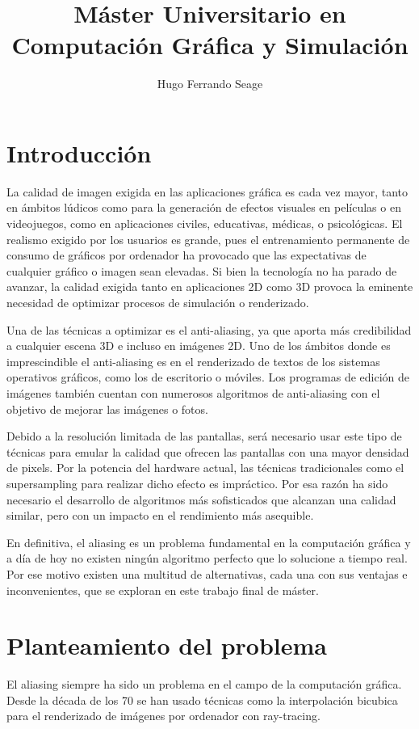 \documentclass[withindex, glossary]{cam-thesis}
\title{Máster Universitario en Computación Gráfica y Simulación\protect\\\bigskip \normalfont{2018\protect\\\bigskip Trabajo Final de Máster\protect\\\bigskip Estudio sobre sistemas de anti-aliasing e implementación de anti-aliasing temporal}}
\author{Hugo Ferrando Seage}
\begin{document}
\frontmatter{}

\chapter{Introducción}

La calidad de imagen exigida en las aplicaciones gráfica es cada vez mayor, tanto en ámbitos lúdicos como para la generación de efectos visuales en películas o en videojuegos, como en aplicaciones civiles, educativas, médicas\cite{rayos}, o psicológicas. El realismo exigido por los usuarios es grande, pues el entrenamiento permanente de consumo de gráficos por ordenador ha provocado que las expectativas de cualquier gráfico o imagen sean elevadas. Si bien la tecnología no ha parado de avanzar, la calidad exigida tanto en aplicaciones 2D como 3D provoca la eminente necesidad de optimizar procesos de simulación o renderizado.

Una de las técnicas a optimizar es el anti-aliasing, ya que aporta más credibilidad a cualquier escena 3D e incluso en imágenes 2D. Uno de los ámbitos donde es imprescindible el anti-aliasing es en el renderizado de textos de los sistemas operativos gráficos, como los de escritorio o móviles. Los programas de edición de imágenes también cuentan con numerosos algoritmos de anti-aliasing con el objetivo de mejorar las imágenes o fotos.

Debido a la resolución limitada de las pantallas, será necesario usar este tipo de técnicas para emular la calidad que ofrecen las pantallas con una mayor densidad de pixels. Por la potencia del hardware actual, las técnicas tradicionales como el supersampling para realizar dicho efecto es impráctico. Por esa razón ha sido necesario el desarrollo de algoritmos más sofisticados que alcanzan una calidad similar, pero con un impacto en el rendimiento más asequible.

En definitiva, el aliasing es un problema fundamental en la computación gráfica y a día de hoy no existen ningún algoritmo perfecto que lo solucione a tiempo real. Por ese motivo existen una multitud de alternativas, cada una con sus ventajas e inconvenientes, que se exploran en este trabajo final de máster.

\chapter{Planteamiento del problema}

El aliasing siempre ha sido un problema en el campo de la computación gráfica. Desde la década de los 70 se han usado técnicas como la interpolación bicubica para el renderizado de imágenes por ordenador con ray-tracing.
\end{document}
